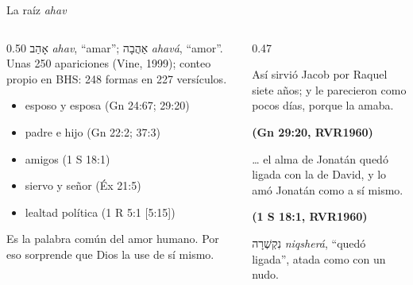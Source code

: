 \documentclass[hyperref={bookmarks=false},aspectratio=169]{beamer}
\newcommand{\heb}[1]{\mbox{\foreignlanguage{hebrew}{#1}}}
\newcommand{\fuente}[1]{\par\hfill{\upshape\bfseries\footnotesize\textcolor{azul}{#1}}}
\begin{document}
\begin{frame}{La raíz \emph{ahav}}
\begin{columns}[t,onlytextwidth]
\begin{column}{0.50\textwidth}\small
\heb{אָהַב} \emph{ahav}, ``amar''; \heb{אַהֲבָה} \emph{ahavá}, ``amor''. Unas 250 apariciones (Vine, 1999); conteo propio en BHS: 248 formas en 227 versículos.
\begin{itemize}
\item esposo y esposa (Gn 24:67; 29:20)
\item padre e hijo (Gn 22:2; 37:3)
\item amigos (1 S 18:1)
\item siervo y señor (Éx 21:5)
\item lealtad política (1 R 5:1 [5:15])
\end{itemize}
\scriptsize Es la palabra común del amor humano. Por eso sorprende que Dios la use de sí mismo.
\end{column}
\begin{column}{0.47\textwidth}
\begin{cita}Así sirvió Jacob por Raquel siete años; y le parecieron como pocos días, porque la amaba.\fuente{(Gn 29:20, RVR1960)}\end{cita}
\begin{cita}\ldots{} el alma de Jonatán quedó ligada con la de David, y lo amó Jonatán como a sí mismo.\fuente{(1 S 18:1, RVR1960)}\end{cita}
\scriptsize\heb{נִקְשְׁרָה} \emph{niqsherá}, ``quedó ligada'', atada como con un nudo.
\end{column}
\end{columns}
\end{frame}
\end{document}
